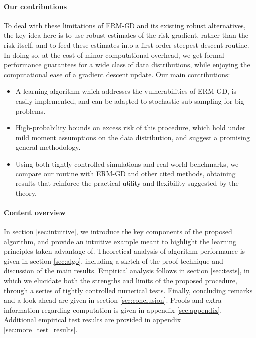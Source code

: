 \documentclass[11pt,oneside]{article}
\theoremstyle{definition} \newtheorem{defn}{Definition}       %
\theoremstyle{plain} \newtheorem{prop}[defn]{Proposition}           %
\theoremstyle{plain} \newtheorem{thm}[defn]{Theorem}                %
\theoremstyle{plain} \newtheorem{lem}[defn]{Lemma}                  %
\theoremstyle{plain} \newtheorem{cor}[defn]{Corollary}              %
\theoremstyle{remark} \newtheorem{rmk}[defn]{Remark}                %
\theoremstyle{remark} \newtheorem{ex}[defn]{Example}                %
\begin{document}
\paragraph{Our contributions}

To deal with these limitations of ERM-GD and its existing robust alternatives, the key idea here is to use robust estimates of the risk gradient, rather than the risk itself, and to feed these estimates into a first-order steepest descent routine. In doing so, at the cost of minor computational overhead, we get formal performance guarantees for a wide class of data distributions, while enjoying the computational ease of a gradient descent update. Our main contributions:
%
\begin{itemize}
\item A learning algorithm which addresses the vulnerabilities of ERM-GD, is easily implemented, and can be adapted to stochastic sub-sampling for big problems.
\item High-probability bounds on excess risk of this procedure, which hold under mild moment assumptions on the data distribution, and suggest a promising general methodology.
\item Using both tightly controlled simulations and real-world benchmarks, we compare our routine with ERM-GD and other cited methods, obtaining results that reinforce the practical utility and flexibility suggested by the theory.
\end{itemize}


\paragraph{Content overview}
In section \ref{sec:intuitive}, we introduce the key components of the proposed algorithm, and provide an intuitive example meant to highlight the learning principles taken advantage of. Theoretical analysis of algorithm performance is given in section \ref{sec:algo}, including a sketch of the proof technique and discussion of the main results. Empirical analysis follows in section \ref{sec:tests}, in which we elucidate both the strengths and limits of the proposed procedure, through a series of tightly controlled numerical tests. Finally, concluding remarks and a look ahead are given in section \ref{sec:conclusion}. Proofs and extra information regarding computation is given in appendix \ref{sec:appendix}. Additional empirical test results are provided in appendix \ref{sec:more_test_results}.
\end{document}
